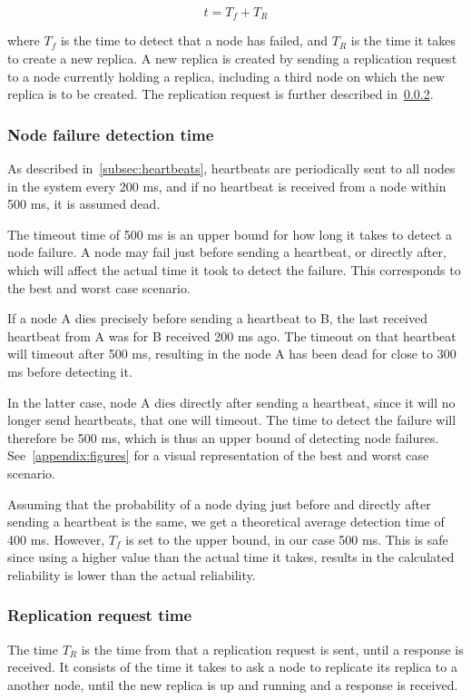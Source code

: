 \documentclass{cslthse-msc}
\begin{document}
\begin{equation} \label{eq:rep_time}
	t = T_f + T_R
\end{equation}

where $T_f$ is the time to detect that a node has failed, and $T_R$ is the time it takes to create a new replica. A new replica is created by sending a replication request to a node currently holding a replica, including a third node on which the new replica is to be created. The replication request is further described in~\cref{sec:replication_time}.

\subsubsection{Node failure detection time} \label{sec:node_failure_detection_time}
As described in~\cref{subsec:heartbeats}, heartbeats are periodically sent to all nodes in the system every 200 ms, and if no heartbeat is received from a node within 500 ms, it is assumed dead.

The timeout time of 500 ms is an upper bound for how long it takes to detect a node failure. A node may fail just before sending a heartbeat, or directly after, which will affect the actual time it took to detect the failure. This corresponds to the best and worst case scenario. 

If a node A dies precisely before sending a heartbeat to B, the last received heartbeat from A was for B received 200 ms ago. The timeout on that heartbeat will timeout after 500 ms, resulting in the node A has been dead for close to 300 ms before detecting it.

In the latter case, node A dies directly after sending a heartbeat, since it will no longer send heartbeats, that one will timeout. The time to detect the failure will therefore be 500 ms, which is thus an upper bound of detecting node failures. See~\cref{appendix:figures} for a visual representation of the best and worst case scenario.

Assuming that the probability of a node dying just before and directly after sending a heartbeat is the same, we get a theoretical average detection time of 400 ms. However, $T_f$ is set to the upper bound, in our case 500 ms. This is safe since using a higher value than the actual time it takes, results in the calculated reliability is lower than the actual reliability.


\subsubsection{Replication request time} \label{sec:replication_time}
The time $T_R$ is the time from that a replication request is sent, until a response is received. It consists of the time it takes to ask a node to replicate its replica to a another node, until the new replica is up and running and a response is received. 
\end{document}
